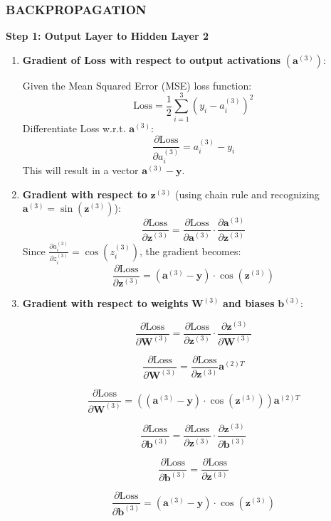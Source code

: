 \documentclass{ioereport}
\begin{document}
\subsubsection*{\MakeUppercase{Backpropagation}}

\textbf{Step 1: Output Layer to Hidden Layer 2}
\begin{enumerate}[label=\textbf{\roman*.}]
  \item \textbf{Gradient of Loss with respect to output activations} $(\mathbf{a}^{(3)})$:
  
  Given the Mean Squared Error (MSE) loss function:
  \[
  \text{Loss} = \frac{1}{2} \sum_{i=1}^{3} (y_i - a^{(3)}_i)^2
  \]
  Differentiate Loss w.r.t. $\mathbf{a}^{(3)}$:
  \[
  \frac{\partial \text{Loss}}{\partial a^{(3)}_i} = a^{(3)}_i - y_i
  \]
  This will result in a vector $\mathbf{a}^{(3)} - \mathbf{y}$.

  \item \textbf{Gradient with respect to} $\mathbf{z}^{(3)}$ (using chain rule and recognizing $\mathbf{a}^{(3)} = \sin(\mathbf{z}^{(3)})$):
  \[
  \frac{\partial \text{Loss}}{\partial \mathbf{z}^{(3)}} = \frac{\partial \text{Loss}}{\partial \mathbf{a}^{(3)}} \cdot \frac{\partial \mathbf{a}^{(3)}}{\partial \mathbf{z}^{(3)}}
  \]
  Since $\frac{\partial a^{(3)}_i}{\partial z^{(3)}_i} = \cos(z^{(3)}_i)$, the gradient becomes:
  \[
  \frac{\partial \text{Loss}}{\partial \mathbf{z}^{(3)}} = (\mathbf{a}^{(3)} - \mathbf{y}) \cdot \cos(\mathbf{z}^{(3)})
  \]

  \item \textbf{Gradient with respect to weights} $\mathbf{W}^{(3)}$ \textbf{and biases} $\mathbf{b}^{(3)}$:
  
  \[
  \frac{\partial \text{Loss}}{\partial \mathbf{W}^{(3)}} = \frac{\partial \text{Loss}}{\partial \mathbf{z}^{(3)}} \cdot \frac{\partial \mathbf{z}^{(3)}}{\partial \mathbf{W}^{(3)}}
  \]
  
  \[
  \frac{\partial \text{Loss}}{\partial \mathbf{W}^{(3)}} = \frac{\partial \text{Loss}}{\partial \mathbf{z}^{(3)}} \mathbf{a}^{(2)T}
  \]
  
  \[
  \frac{\partial \text{Loss}}{\partial \mathbf{W}^{(3)}} = \left((\mathbf{a}^{(3)} - \mathbf{y}) \cdot \cos(\mathbf{z}^{(3)})\right) \mathbf{a}^{(2)T}
  \]


  \[
  \frac{\partial \text{Loss}}{\partial \mathbf{b}^{(3)}} = \frac{\partial \text{Loss}}{\partial \mathbf{z}^{(3)}} \cdot \frac{\partial \mathbf{z}^{(3)}}{\partial \mathbf{b}^{(3)}}
  \]

  \[
  \frac{\partial \text{Loss}}{\partial \mathbf{b}^{(3)}} = \frac{\partial \text{Loss}}{\partial \mathbf{z}^{(3)}}
  \]

  \[
  \frac{\partial \text{Loss}}{\partial \mathbf{b}^{(3)}} = (\mathbf{a}^{(3)} - \mathbf{y}) \cdot \cos(\mathbf{z}^{(3)})
  \]
  
\end{enumerate}
\end{document}
